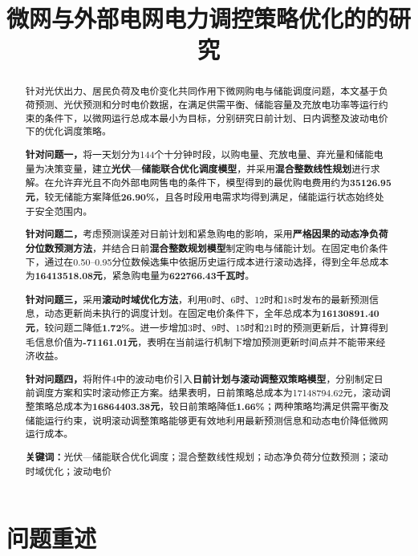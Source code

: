 \documentclass[UTF8,a4paper,12pt,fontset=fandol]{ctexart}
\title{\heiti\bfseries 微网与外部电网电力调控策略优化的的研究}
\author{}
\date{}
\numberwithin{equation}{section}
\begin{document}
\vspace{-5.5em}
\maketitle
\vspace{-2.2em}

\begin{abstract}
\normalsize
针对光伏出力、居民负荷及电价变化共同作用下微网购电与储能调度问题，本文基于负荷预测、光伏预测和分时电价数据，在满足供需平衡、储能容量及充放电功率等运行约束的条件下，以微网运行总成本最小为目标，分别研究日前计划、日内调整及波动电价下的优化调度策略。

\textbf{针对问题一，}将一天划分为144个十分钟时段，以购电量、充放电量、弃光量和储能电量为决策变量，建立\textbf{光伏—储能联合优化调度模型}，并采用\textbf{混合整数线性规划}进行求解。在允许弃光且不向外部电网售电的条件下，模型得到的最优购电费用约为\textbf{35126.95元}，较无储能方案降低\textbf{26.90\%}，且各时段用电需求均得到满足，储能运行状态始终处于安全范围内。

\textbf{针对问题二，}考虑预测误差对日前计划和紧急购电的影响，采用\textbf{严格因果的动态净负荷分位数预测方法}，并结合日前\textbf{混合整数规划模型}制定购电与储能计划。在固定电价条件下，通过在0.50--0.95分位数候选集中依据历史运行成本进行滚动选择，得到全年总成本为\textbf{16413518.08元}，紧急购电量为\textbf{622766.43千瓦时}。

\textbf{针对问题三，}采用\textbf{滚动时域优化方法}，利用0时、6时、12时和18时发布的最新预测信息，动态更新尚未执行的调度计划。在固定电价条件下，全年总成本为\textbf{16130891.40元}，较问题二降低\textbf{1.72\%}。进一步增加3时、9时、15时和21时的预测更新后，计算得到毛信息价值为\textbf{-71161.01元}，表明在当前运行机制下增加预测更新时间点并不能带来经济收益。

\textbf{针对问题四，}将附件4中的波动电价引入\textbf{日前计划与滚动调整双策略模型}，分别制定日前调度方案和实时滚动修正方案。结果表明，日前策略总成本为17148794.62元，滚动调整策略总成本为\textbf{16864403.38元}，较日前策略降低\textbf{1.66\%}；两种策略均满足供需平衡及储能运行约束，说明滚动调整策略能够更有效地利用最新预测信息和动态电价降低微网运行成本。

\par\medskip
\noindent\textbf{关键词：}光伏—储能联合优化调度；混合整数线性规划；动态净负荷分位数预测；滚动时域优化；波动电价\par
\end{abstract}
\clearpage



\section{问题重述}
\end{document}
